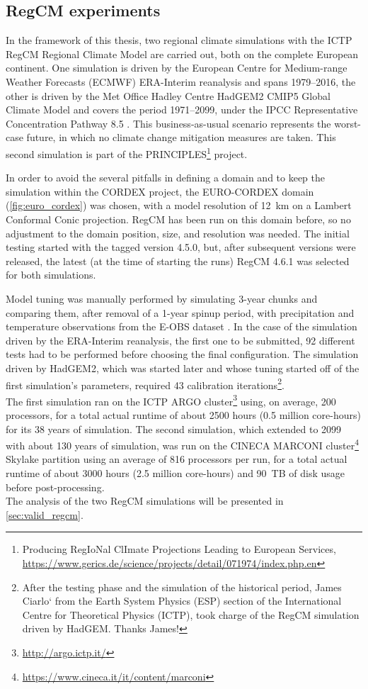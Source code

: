 \subsection{RegCM experiments}\label{sec:experiments}
In the framework of this thesis, two regional climate simulations with the ICTP RegCM Regional Climate Model are carried out, both on the complete European continent. One simulation is driven by the European Centre for Medium-range Weather Forecasts (ECMWF) ERA-Interim reanalysis \citep{Dee2011} and spans 1979--2016, the other is driven by the Met Office Hadley Centre HadGEM2 CMIP5 Global Climate Model \citep{Collins2011} and covers the period 1971--2099, under the IPCC Representative Concentration Pathway
8.5 \citep[RCP8.5,][]{IPCC2008moss,Riahi2007}. This business-as-usual scenario represents the worst-case future, in which no climate change mitigation measures are taken. This second simulation is part of the PRINCIPLES\footnote{Producing RegIoNal ClImate Projections Leading to European Services, \url{https://www.gerics.de/science/projects/detail/071974/index.php.en}} project.

In order to avoid the several pitfalls in defining a domain and to keep the simulation within the CORDEX project, the EURO-CORDEX domain (\cref{fig:euro_cordex}) was chosen, with a model resolution of \SI{12}{\kilo\meter} on a Lambert Conformal Conic projection. RegCM has been run on this domain before, so no adjustment to the domain position, size, and resolution was needed.
The initial testing started with the tagged version 4.5.0, but, after subsequent versions were released, the latest (at the time of starting the runs) RegCM 4.6.1 was selected for both simulations.

Model tuning was manually performed by simulating 3-year chunks and comparing them, after removal of a 1-year spinup period, with precipitation and temperature observations from the E-OBS dataset \citep{Haylock2008}.
In the case of the simulation driven by the ERA-Interim reanalysis, the first one to be submitted, 92 different tests had to be performed before choosing the final configuration.
The simulation driven by HadGEM2, which was started later and whose tuning started off of the first simulation's parameters, required 43 calibration iterations\footnote{
After the testing phase and the simulation of the historical period, James Ciarlo` from the Earth System Physics (ESP) section of the International Centre for Theoretical Physics (ICTP), took charge of the RegCM simulation driven by HadGEM. Thanks James!
}.\\
The first simulation ran on the ICTP ARGO cluster\footnote{\url{http://argo.ictp.it/}} using, on average, 200 processors, for a total actual runtime of about 2500 hours (0.5 million core-hours) for its 38 years of simulation.
The second simulation, which extended to 2099 with about 130 years of simulation, was run on the CINECA MARCONI cluster\footnote{\url{https://www.cineca.it/it/content/marconi}} Skylake partition using an average of 816 processors per run, for a total actual runtime of about 3000 hours (2.5 million core-hours) and \SI{90}{\tera B} of disk usage before post-processing.\\
The analysis of the two RegCM simulations will be presented in \cref{sec:valid_regcm}.


